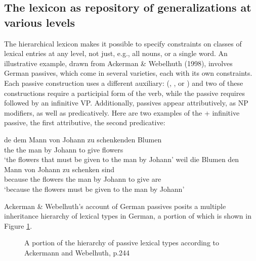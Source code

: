 \documentclass[output=paper]{langsci/langscibook}
\begin{document}
\subsection{The lexicon as repository of generalizations at various levels}

The hierarchical lexicon makes it possible to specify constraints on classes of lexical entries at any level, not just, e.g., all nouns, or a single word.
An illustrative example, drawn from Ackerman \& Webelhuth (1998), involves German passives, which come in several varieties, each with its own constraints.
Each passive construction uses a different auxiliary: (, , or ) and two of these constructions require a participial form of the verb, while the  passive requires  followed by an infinitive VP.
Additionally, passives appear attributively, as NP modifiers, as well as predicatively.
Here are two examples of the  + infinitive passive, the first attributive, the second predicative:

\begin{exe}
        \ex\label{zu-pass}
        \begin{xlist}
                \ex\label{zu-pass-a}
                \gll de dem Mann von Johann zu schenkenden Blumen \\
                the the man by Johann to give flowers  \\
                \glt `the flowers that must be given to the man by Johann'
\ex\label{zu-pass-b}
                \gll weil die Blumen den Mann von Johann zu schenken sind \\
                 because the flowers the man by Johann to give are \\
                 \glt `because the flowers must be given to the man by Johann'
        \end{xlist}
\end{exe}

Ackerman \& Webelhuth's account of German passives posits a multiple inheritance hierarchy of lexical types in German, a portion of which is shown in Figure \ref{fig:pass-hier}.


\begin{figure}
\caption{\label{fig:pass-hier}A portion of the hierarchy of passive lexical types according to Ackermann and Webelhuth, p.244}	
\end{figure}
\end{document}

